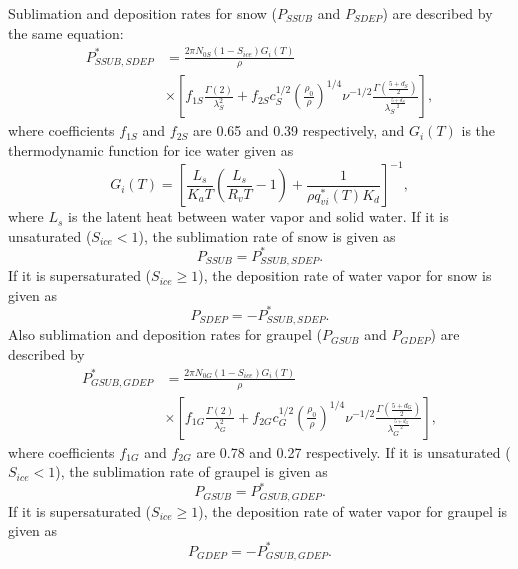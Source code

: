 Sublimation and deposition rates for snow ($P_{SSUB}$ and $P_{SDEP}$) are described by the same equation:
\begin{align}
  P^{*}_{SSUB,SDEP}&=\frac{2\pi N_{0S}(1-S_{ice})G_{i}(T)}{\rho} \nonumber \\
  &\times\left[f_{1S}\frac{\Gamma(2)}{\lambda^{2}_{S}}+f_{2S}c^{1/2}_{S}\left(\frac{\rho_{0}}{\rho}\right)^{1/4}\nu^{-1/2}\frac{\Gamma(\frac{5+d_{S}}{2})}{\lambda^{\frac{5+d_{S}}{2}}_{S}}\right],
\end{align}
where coefficients $f_{1S}$ and $f_{2S}$ are 0.65 and 0.39 respectively, and $G_{i}(T)$ is the thermodynamic function for ice water given as
\begin{equation}
  G_{i}(T)=\left[\frac{L_{s}}{K_{a}T}\left(\frac{L_{s}}{R_{v}T}-1\right)+\frac{1}{\rho q^{*}_{vi}(T)K_{d}}\right]^{-1},
\end{equation}
where $L_{s}$ is the latent heat between water vapor and solid water. If it is unsaturated ($S_{ice} < 1$), the sublimation rate of snow is given as
\begin{equation}
  P_{SSUB}=P^{*}_{SSUB,SDEP}.
\end{equation}
If it is supersaturated ($S_{ice} \geq 1$), the deposition rate of water vapor for snow is given as
\begin{equation}
  P_{SDEP}=-P^{*}_{SSUB,SDEP}.
\end{equation}
Also sublimation and deposition rates for graupel ($P_{GSUB}$ and $P_{GDEP}$) are described by
\begin{align}
  P^{*}_{GSUB,GDEP}&=\frac{2\pi N_{0G}(1-S_{ice})G_{i}(T)}{\rho} \nonumber \\
  &\times\left[f_{1G}\frac{\Gamma(2)}{\lambda^{2}_{G}}+f_{2G}c^{1/2}_{G}\left(\frac{\rho_{0}}{\rho}\right)^{1/4}\nu^{-1/2}\frac{\Gamma(\frac{5+d_{G}}{2})}{\lambda^{\frac{5+d_{G}}{2}}_{G}}\right],
\end{align}
where coefficients $f_{1G}$ and $f_{2G}$ are 0.78 and 0.27 respectively. If it is unsaturated ($S_{ice} < 1$), the sublimation rate of graupel is given as
\begin{equation}
  P_{GSUB}=P^{*}_{GSUB,GDEP}.
\end{equation}
If it is supersaturated ($S_{ice} \geq 1$), the deposition rate of water vapor for graupel is given as
\begin{equation}
  P_{GDEP}=-P^{*}_{GSUB,GDEP}.
\end{equation}

